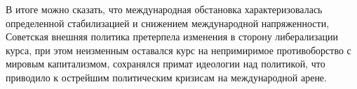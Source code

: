 \documentclass[a4paper, 12pt]{article}
\begin{document}
В итоге можно сказать, что международная обстановка характеризовалась определенной стабилизацией и снижением международной напряженности, Советская внешняя политика претерпела изменения в сторону либерализации курса, при этом неизменным оставался курс на непримиримое противоборство с мировым капитализмом, сохранялся примат идеологии над политикой, что приводило к острейшим политическим кризисам на международной арене.
\end{document}
